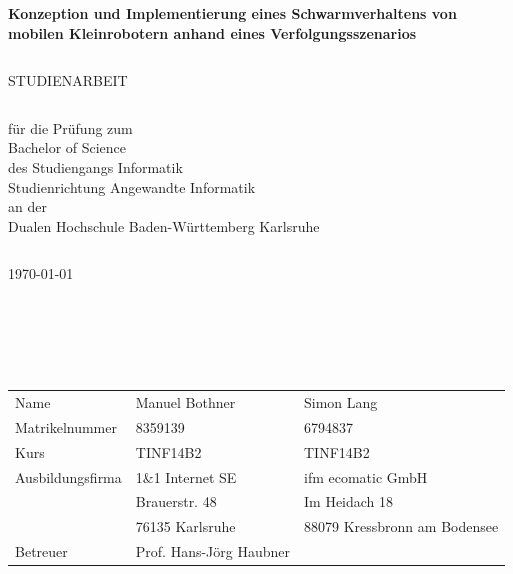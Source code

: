 \pagestyle{scrheadings}
\clearscrheadfoot
{}
\begin{verbatim}
\end{verbatim}
\begin{center}
	\large{\textbf{Konzeption und Implementierung eines Schwarmverhaltens von mobilen Kleinrobotern anhand eines Verfolgungsszenarios}}
\end{center}
\begin{verbatim}

\end{verbatim}
\begin{center}
	\large{STUDIENARBEIT}
\end{center}
\begin{verbatim}

\end{verbatim}
\begin{center}
	für die Prüfung zum\\
	\medskip
	Bachelor of Science\\
	\medskip
	des Studiengangs Informatik\\
	Studienrichtung Angewandte Informatik\\
	\medskip
	an der\\
	\medskip
	Dualen Hochschule Baden-Württemberg Karlsruhe\\
\end{center}
\begin{verbatim}
\end{verbatim}
\begin{center}
	\today
\end{center}
\begin{verbatim}





\end{verbatim}	
\begin{flushleft}
	\begin{tabular}{p{4cm} p{6cm} p{6cm}}
		Name & Manuel Bothner & Simon Lang\\
		Matrikelnummer & 8359139 & 6794837\\
		Kurs & TINF14B2 & TINF14B2\\
		Ausbildungsfirma & 1\&1 Internet SE & ifm ecomatic GmbH\\
		& Brauerstr. 48 & Im Heidach 18\\
		& 76135 Karlsruhe & 88079 Kressbronn am Bodensee\\
		Betreuer & Prof. Hans-Jörg Haubner & \\
	\end{tabular}
\end{flushleft}